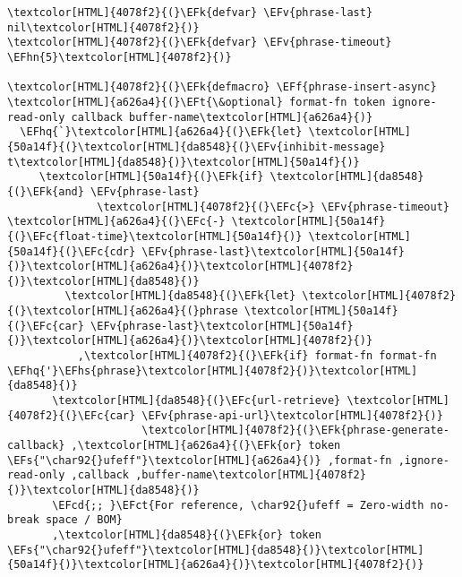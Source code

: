 \documentclass{scrartcl}
\newcommand{\EFk}[1]{\textcolor{EFk}{#1}} %
\newcommand{\EFt}[1]{\textcolor{EFt}{#1}} %
\newcommand{\EFs}[1]{\textcolor{EFs}{#1}} %
\newcommand{\EFct}[1]{\textcolor{EFct}{#1}} %
\newcommand{\EFc}[1]{\textcolor{EFc}{#1}} %
\newcommand{\EFv}[1]{\textcolor{EFv}{#1}} %
\newcommand{\EFf}[1]{\textcolor{EFf}{#1}} %
\newcommand{\EFcd}[1]{\textcolor{EFcd}{#1}} %
\newcommand{\EFhn}[1]{\textcolor{EFhn}{\textbf{#1}}} %
\newcommand{\EFhq}[1]{\textcolor{EFhq}{#1}} %
\newcommand{\EFhs}[1]{\textcolor{EFhs}{#1}} %
\begin{document}
\begin{Code}
\begin{Verbatim}[]
\textcolor[HTML]{4078f2}{(}\EFk{defvar} \EFv{phrase-last} nil\textcolor[HTML]{4078f2}{)}
\textcolor[HTML]{4078f2}{(}\EFk{defvar} \EFv{phrase-timeout} \EFhn{5}\textcolor[HTML]{4078f2}{)}

\textcolor[HTML]{4078f2}{(}\EFk{defmacro} \EFf{phrase-insert-async} \textcolor[HTML]{a626a4}{(}\EFt{\&optional} format-fn token ignore-read-only callback buffer-name\textcolor[HTML]{a626a4}{)}
  \EFhq{`}\textcolor[HTML]{a626a4}{(}\EFk{let} \textcolor[HTML]{50a14f}{(}\textcolor[HTML]{da8548}{(}\EFv{inhibit-message} t\textcolor[HTML]{da8548}{)}\textcolor[HTML]{50a14f}{)}
     \textcolor[HTML]{50a14f}{(}\EFk{if} \textcolor[HTML]{da8548}{(}\EFk{and} \EFv{phrase-last}
              \textcolor[HTML]{4078f2}{(}\EFc{>} \EFv{phrase-timeout} \textcolor[HTML]{a626a4}{(}\EFc{-} \textcolor[HTML]{50a14f}{(}\EFc{float-time}\textcolor[HTML]{50a14f}{)} \textcolor[HTML]{50a14f}{(}\EFc{cdr} \EFv{phrase-last}\textcolor[HTML]{50a14f}{)}\textcolor[HTML]{a626a4}{)}\textcolor[HTML]{4078f2}{)}\textcolor[HTML]{da8548}{)}
         \textcolor[HTML]{da8548}{(}\EFk{let} \textcolor[HTML]{4078f2}{(}\textcolor[HTML]{a626a4}{(}phrase \textcolor[HTML]{50a14f}{(}\EFc{car} \EFv{phrase-last}\textcolor[HTML]{50a14f}{)}\textcolor[HTML]{a626a4}{)}\textcolor[HTML]{4078f2}{)}
           ,\textcolor[HTML]{4078f2}{(}\EFk{if} format-fn format-fn \EFhq{'}\EFhs{phrase}\textcolor[HTML]{4078f2}{)}\textcolor[HTML]{da8548}{)}
       \textcolor[HTML]{da8548}{(}\EFc{url-retrieve} \textcolor[HTML]{4078f2}{(}\EFc{car} \EFv{phrase-api-url}\textcolor[HTML]{4078f2}{)}
                     \textcolor[HTML]{4078f2}{(}\EFk{phrase-generate-callback} ,\textcolor[HTML]{a626a4}{(}\EFk{or} token \EFs{"\char92{}ufeff"}\textcolor[HTML]{a626a4}{)} ,format-fn ,ignore-read-only ,callback ,buffer-name\textcolor[HTML]{4078f2}{)}\textcolor[HTML]{da8548}{)}
       \EFcd{;; }\EFct{For reference, \char92{}ufeff = Zero-width no-break space / BOM}
       ,\textcolor[HTML]{da8548}{(}\EFk{or} token \EFs{"\char92{}ufeff"}\textcolor[HTML]{da8548}{)}\textcolor[HTML]{50a14f}{)}\textcolor[HTML]{a626a4}{)}\textcolor[HTML]{4078f2}{)}


\end{Verbatim}
\end{Code}
\end{document}
